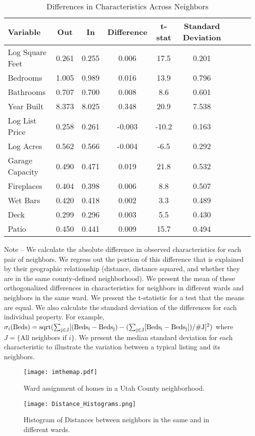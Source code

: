 \documentclass[12pt]{article}
\begin{document}
\begin{table}[ht]
\centering
\caption{Differences in Characteristics Across Neighbors}
\begin{tabular}{@{}lcccccccc@{}} \toprule
Variable        & Out   & In    & Difference   & t-stat   & Standard Deviation\\\midrule
Log Square Feet & 0.261 & 0.255 & 0.006        & 17.5     &  0.201\\
Bedrooms        & 1.005 & 0.989 & 0.016        & 13.9     &  0.796\\
Bathrooms       & 0.707 & 0.700 & 0.008        & 8.6      &  0.601\\
Year Built      & 8.373 & 8.025 & 0.348        & 20.9     &  7.538\\
Log List Price  & 0.258 & 0.261 & -0.003       & -10.2    &  0.163\\
Log Acres       & 0.562 & 0.566 & -0.004       & -6.5     &  0.292\\
Garage Capacity & 0.490 & 0.471 & 0.019        & 21.8     &  0.532\\
Fireplaces      & 0.404 & 0.398 & 0.006        & 8.8      &  0.507\\
Wet Bars        & 0.420 & 0.418 & 0.002        & 3.3      &  0.489\\
Deck            & 0.299 & 0.296 & 0.003        & 5.5      &  0.430\\
Patio           & 0.450 & 0.441 & 0.009        & 15.7     &  0.494\\\bottomrule
\end{tabular}
\begin{minipage}{.88\hsize}
{\footnotesize Note -- We calculate the absolute difference in observed characteristics for each pair of neighbors. We regress out the portion of this difference that is explained by their geographic relationship (distance, distance squared, and whether they are in the same county-defined neighborhood). We present the mean of these orthogonalized differences in characteristics for neighbors in different wards and neighbors in the same ward. We present the     t-statistic for a test that the means are equal. We also calculate the standard deviation of the differences for each individual property. For example,  $ \sigma_i(\rm{Beds}) = sqrt(\sum_{j \in J}[(Beds_i - Beds_j) - (\sum_{j \in J}[Beds_i - Beds_j])/\#J]^2)$  where $J = \{$All neighbors if $i\}$. We present the median standard deviation for each characteristic to illustrate the variation between a typical listing and its neighbors.}
\end{minipage}
\end{table}
%
\begin{figure}
    \centering
    \caption{Ward assignment of homes in a Utah County neighborhood.}
    \texttt{[image: imthemap.pdf]}

\end{figure}
\begin{figure}
    \centering
    \caption{Histogram of Distances between neighbors in the same and in different wards.}
    \texttt{[image: Distance\_Histograms.png]}

\end{figure}
\end{document}
